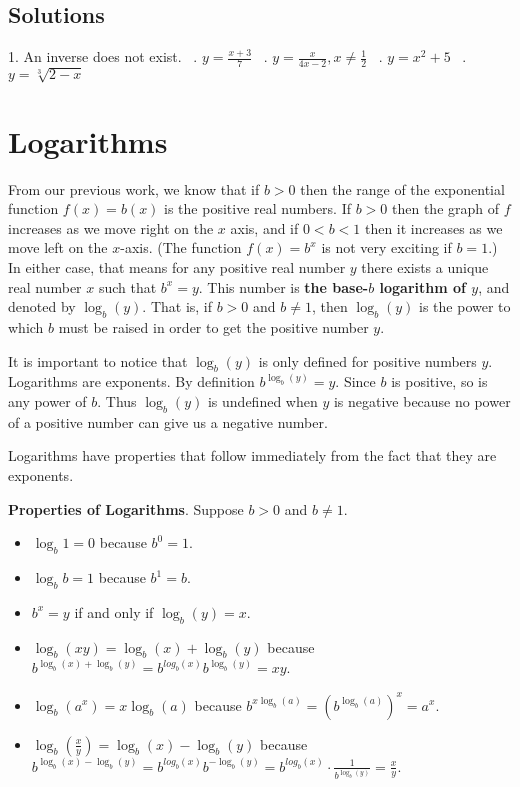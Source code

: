 \documentclass[11pt]{book}               %
\begin{document}
\subsection{Solutions} 
1. An inverse does not exist.  \ . $y=\frac{x+3}{7}$  \ . $ y=\frac{x}{4x-2}, x \neq \frac{1}{2}$  \ . $y=x^2+5$  \ .$y=\sqrt[3]{2-x}$

\newpage
\section{Logarithms}

From our previous work, we know that if $b > 0$ then the range of the exponential function $f(x) = b(x)$
is the positive real numbers.
If $b > 0$ then the graph of $f$ increases as we move right on the $x$ axis, and if $0 < b < 1$ then it increases as we move left on the $x$-axis.
(The function $f(x) = b^x$ is not very exciting if $b = 1$.)
In either case, that means for any positive real number $y$ there exists a unique real number $x$ such that $b^x = y$.
This number is \textbf{the base-$b$ logarithm of $y$}, and denoted by $\log_b(y)$.
That is, if $b > 0$ and $b \neq 1$, then $\log_b(y)$ is the power to which $b$ must be raised in
order to get the positive number $y$.

It is important to notice that $\log_b(y)$ is only defined for positive numbers $y$.
Logarithms are exponents.
By definition $b^{\log_b(y)} = y$.
Since $b$ is positive, so is any power of $b$.
Thus $\log_b(y)$ is undefined when $y$ is negative because no power of a 
positive number can give us a negative number.

Logarithms have properties that follow immediately from the fact that they are exponents.

\noindent
\textbf{Properties of Logarithms}.  Suppose $b > 0$ and $b \neq 1$.
\begin{itemize}
\item $ \log_b{1} = 0 $ because $b^0 = 1$.
\item $ \log_b{b} = 1 $ because $b^1 = b$.
\item $ b^x = y$ if and only if $\log_b(y) = x$.

\medskip
\item $\log_b(xy) = \log_b(x) + \log_b(y)$ because $b^{\log_b(x) + \log_b(y)} = b^{log_b(x)}  b^{\log_b(y)} = xy$.
\item $\log_b(a^x) = x \log_b(a)$ because $b^{x \log_b(a)} = \left(b^{\log_b(a)}\right)^x = a^x$.
\item $\log_b\left(\frac{x}{y}\right) =  \log_b(x) - \log_b(y)$ because 
$b^{ \log_b(x) - \log_b(y)} = b^{log_b(x)}  b^{-\log_b(y)} = 
 b^{log_b(x)}  \cdot \frac{1}{b^{\log_b(y)}} = 
\frac{x}{y}$.

\end{itemize}
\end{document}
